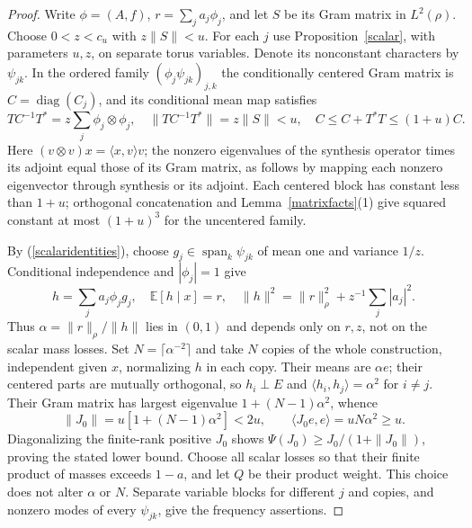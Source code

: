 \documentclass[reqno,a4paper,12pt]{amsart}
\newcommand{\E}{\mathbb E}
\newcommand{\spn}{\operatorname{span}}
\newcommand{\diag}{\operatorname{diag}}
\newcommand{\ip}[2]{\langle #1,#2\rangle}
\begin{document}
\begin{proof}
Write $\phi=(A,f)$, $r=\sum_j a_j\phi_j$, and let $S$ be its Gram
matrix in $L^2(\rho)$. Choose $0<z<c_u$ with $z\|S\|<u$.
For each $j$ use Proposition~\ref{scalar}, with parameters $u,z$, on
separate torus variables. Denote its nonconstant characters by $\psi_{jk}$.
In the ordered family $(\phi_j\psi_{jk})_{j,k}$ the conditionally centered
Gram matrix is $C=\diag(C_j)$, and its conditional mean map satisfies
\[
 TC^{-1}T^*=z\sum_j\phi_j\otimes\phi_j,
 \quad\|TC^{-1}T^*\|=z\|S\|<u,
 \quad C\le C+T^*T\le(1+u)C.
\]
Here $(v\otimes v)x=\ip{x}{v}v$; the nonzero eigenvalues of the
synthesis operator times its adjoint equal those of its Gram matrix,
as follows by mapping each nonzero eigenvector through synthesis or its
adjoint. Each centered block has constant less than $1+u$; orthogonal
concatenation and Lemma~\ref{matrixfacts}(1) give squared constant
at most $(1+u)^3$ for the uncentered family.

By (\ref{scalaridentities}), choose $g_j\in\spn_k\psi_{jk}$ of mean one
and variance $1/z$. Conditional independence and $|\phi_j|=1$ give
\[
 h=\sum_j a_j\phi_jg_j,\quad \E[h\mid x]=r,\quad
 \|h\|^2=\|r\|_\rho^2+z^{-1}\sum_j|a_j|^2.
\]
Thus $\alpha=\|r\|_\rho/\|h\|$ lies in $(0,1)$ and depends only
on $r,z$, not on the scalar mass losses.
Set $N=\lceil\alpha^{-2}\rceil$ and take $N$ copies of the whole
construction, independent given $x$, normalizing $h$ in each copy.
Their means are $\alpha e$; their centered parts are mutually orthogonal,
so $h_i\perp E$ and $\ip{h_i}{h_j}=\alpha^2$ for $i\ne j$.
Their Gram matrix has largest eigenvalue $1+(N-1)\alpha^2$, whence
\[
 \|J_0\|=u[1+(N-1)\alpha^2]<2u,\qquad
 \ip{J_0e}{e}=uN\alpha^2\ge u.
\]
Diagonalizing the finite-rank positive $J_0$ shows
$\Psi(J_0)\ge J_0/(1+\|J_0\|)$, proving the stated lower bound.
Choose all scalar losses so that their finite product of masses exceeds
$1-a$, and let $Q$ be their product weight. This choice does not alter
$\alpha$ or $N$. Separate variable blocks for different $j$ and copies,
and nonzero modes of every $\psi_{jk}$, give the frequency assertions.
\end{proof}
\end{document}
